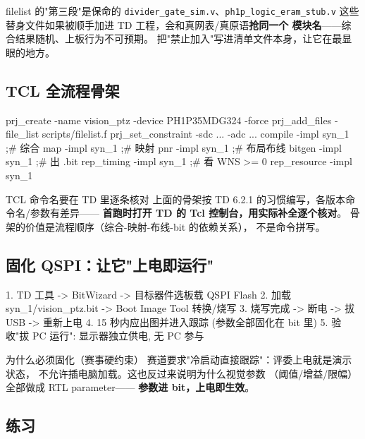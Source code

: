 \documentclass[11pt]{ctexart}
\newcommand{\code}[1]{\texttt{#1}}
\begin{document}
\begin{warnbox}{filelist 的"第三段"是保命的}
\code{divider\_gate\_sim.v}、\code{ph1p\_logic\_eram\_stub.v} 这些
替身文件如果被顺手加进 TD 工程，会和真网表/真原语\textbf{抢同一个
模块名}——综合结果随机、上板行为不可预期。
把"禁止加入"写进清单文件本身，让它在最显眼的地方。
\end{warnbox}

\subsection{TCL 全流程骨架}

\begin{Verilog}
prj_create -name vision_ptz -device PH1P35MDG324 -force
prj_add_files -file_list scripts/filelist.f
prj_set_constraint -sdc ... -adc ...
compile -impl syn_1     ;# 综合
map    -impl syn_1     ;# 映射
pnr    -impl syn_1     ;# 布局布线
bitgen -impl syn_1     ;# 出 .bit
rep_timing -impl syn_1 ;# 看 WNS >= 0
rep_resource -impl syn_1
\end{Verilog}

\begin{warnbox}{TCL 命令名要在 TD 里逐条核对}
上面的骨架按 TD 6.2.1 的习惯编写，各版本命令名/参数有差异——
\textbf{首跑时打开 TD 的 Tcl 控制台，用实际补全逐个核对}。
骨架的价值是流程顺序（综合-映射-布线-bit 的依赖关系），
不是命令拼写。
\end{warnbox}

\subsection{固化 QSPI：让它"上电即运行"}

\begin{Verilog}
1. TD 工具 -> BitWizard -> 目标器件选板载 QSPI Flash
2. 加载 syn_1/vision_ptz.bit -> Boot Image Tool 转换/烧写
3. 烧写完成 -> 断电 -> 拔 USB -> 重新上电
4. 15 秒内应出图并进入跟踪 (参数全部固化在 bit 里)
5. 验收"拔 PC 运行": 显示器独立供电, 无 PC 参与
\end{Verilog}

\begin{keybox}{为什么必须固化（赛事硬约束）}
赛道要求"冷启动直接跟踪"：评委上电就是演示状态，
不允许插电脑加载。这也反过来说明为什么视觉参数
（阈值/增益/限幅）全部做成 RTL parameter——
\textbf{参数进 bit，上电即生效}。
\end{keybox}

\subsection{练习}
\end{document}
